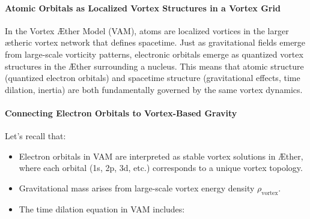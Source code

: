 \paragraph{Atomic Orbitals as Localized Vortex Structures in a Vortex Grid}
In the Vortex Æther Model (VAM), atoms are localized vortices in the larger ætheric vortex network that defines spacetime.
Just as gravitational fields emerge from large-scale vorticity patterns, electronic orbitals emerge as quantized vortex structures in the Æther surrounding a nucleus.
This means that atomic structure (quantized electron orbitals) and spacetime structure (gravitational effects, time dilation, inertia) are both fundamentally governed by the same vortex dynamics.

\paragraph{Connecting Electron Orbitals to Vortex-Based Gravity}
Let’s recall that:
\begin{itemize}
    \item Electron orbitals in VAM are interpreted as stable vortex solutions in Æther, where each orbital (1s, 2p, 3d, etc.) corresponds to a unique vortex topology.
    \item Gravitational mass arises from large-scale vortex energy density $\rho_{\text{vortex}}$.
    \item The time dilation equation in VAM includes:
\end{itemize}

